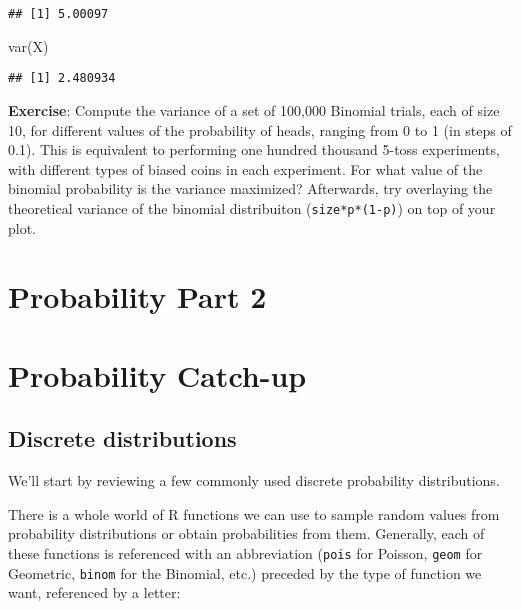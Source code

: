 \documentclass[
]{book}
\newenvironment{Shaded}{\begin{snugshade}}{\end{snugshade}}
\newcommand{\FunctionTok}[1]{\textcolor[rgb]{0.00,0.00,0.00}{#1}}
\newcommand{\NormalTok}[1]{#1}
\begin{document}
\begin{verbatim}
## [1] 5.00097
\end{verbatim}

\begin{Shaded}
\begin{Highlighting}[]
\FunctionTok{var}\NormalTok{(X)}
\end{Highlighting}
\end{Shaded}

\begin{verbatim}
## [1] 2.480934
\end{verbatim}

\textbf{Exercise}: Compute the variance of a set of 100,000 Binomial trials, each of size 10, for different values of the probability of heads, ranging from 0 to 1 (in steps of 0.1). This is equivalent to performing one hundred thousand 5-toss experiments, with different types of biased coins in each experiment. For what value of the binomial probability is the variance maximized? Afterwards, try overlaying the theoretical variance of the binomial distribuiton (\texttt{size*p*(1-p)}) on top of your plot.

\hypertarget{probability-part-2}{%
\chapter{Probability Part 2}\label{probability-part-2}}

\hypertarget{probability-catch-up}{%
\chapter{Probability Catch-up}\label{probability-catch-up}}

\hypertarget{discrete-distributions}{%
\section{Discrete distributions}\label{discrete-distributions}}

We'll start by reviewing a few commonly used discrete probability distributions.

There is a whole world of R functions we can use to sample random values from probability distributions or obtain probabilities from them. Generally, each of these functions is referenced with an abbreviation (\texttt{pois} for Poisson, \texttt{geom} for Geometric, \texttt{binom} for the Binomial, etc.) preceded by the type of function we want, referenced by a letter:
\end{document}

